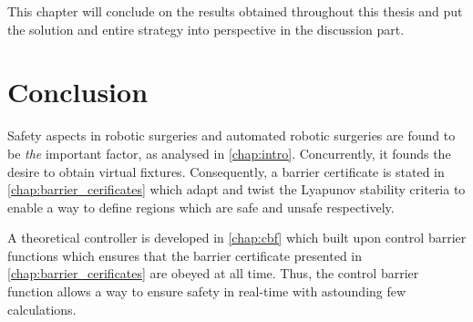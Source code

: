 This chapter will conclude on the results obtained throughout this thesis and put the solution and entire strategy into perspective in the discussion part.
\section*{Conclusion}
Safety aspects in robotic surgeries and automated robotic surgeries are found to be \textit{the} important factor, as analysed in \autoref{chap:intro}. Concurrently, it founds the desire to obtain virtual fixtures. Consequently, a barrier certificate is stated in \autoref{chap:barrier_cerificates} which adapt and twist the Lyapunov stability criteria to enable a way to define regions which are safe and unsafe respectively. 

A theoretical controller is developed in \autoref{chap:cbf} which built upon control barrier functions which ensures that the barrier certificate presented in \autoref{chap:barrier_cerificates} are obeyed at all time. Thus, the control barrier function allows a way to ensure safety in real-time with astounding few calculations.

